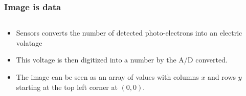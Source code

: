 \documentclass[ignorenonframetext,aspectratio=169,10pt,xcolor=table]{beamer}
\begin{document}
\begin{frame} \frametitle{Image is data}
  \begin{columns}
    \begin{column}{.6\textwidth}
      \begin{itemize}
      \item Sensors converts the number of detected photo-electrons
        into an electric volatage
      \item This voltage is then digitized into a number by the A/D
        converted.
      \item The image can be seen as an array of values with columns
        $x$ and rows $y$ starting at the top left corner at $(0,0)$.
      \end{itemize}
      \end{column}
    \begin{column}{.4\textwidth} 
    \end{column}
  \end{columns}
\end{frame}
\end{document}
